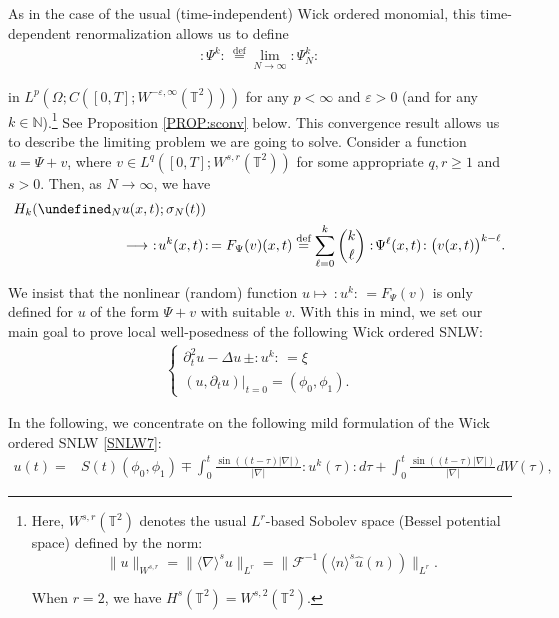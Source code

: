 \documentclass[letterpaper, 11pt,  reqno]{amsart}
\newcommand{\1}{\hspace{0.5mm}\text{I}\hspace{0.5mm}}
\newcommand{\noi}{\noindent}
\newcommand{\T}{\mathbb{T}}
\let\P= \undefined
\newcommand{\P}{\mathbf{P}}
\newcommand{\F}{\mathcal{F}}
\newcommand{\nb}{\nabla}
\newcommand{\Dl}{\Delta}
\newcommand{\eps}{\varepsilon}
\newcommand{\ft}{\widehat}
\newcommand{\dt}{\partial_t}
\renewcommand{\l}{\ell}
\renewcommand{\O}{\Omega}
\newcommand{\jb}[1]
{\langle #1 \rangle}
\newcommand{\N}{\mathbb{N}}
\numberwithin{equation}{section}
\numberwithin{theorem}{section}
\begin{document}
As in the case of  the usual (time-independent) Wick ordered monomial, 
this time-dependent renormalization allows us
to define 
\begin{align}
:\! \Psi^k  \!: \,      \stackrel{\text{def}}= \lim_{N\to \infty}    :\! \Psi_N^k \!: 
\label{Wick2}
\end{align}

\noi
in $L^p(\O; C([0,T];W^{-\eps,\infty}(\T^2)))$
for any $p < \infty$ and $\eps >  0$
(and for any $k \in \N$).\footnote{Here, $W^{s, r}(\T^2)$
denotes the usual $L^r$-based Sobolev space (Bessel potential space) defined by the norm:
\[\| u\|_{W^{s, r}} = \| \jb{\nb}^s u \|_{L^r} = \big\| \F^{-1}( \jb{n}^s \ft u(n))\big\|_{L^r}.\]

\noi
When $r = 2$, we have $H^s(\T^2) = W^{s, 2}(\T^2)$.} 
See Proposition \ref{PROP:sconv} below. 
This convergence result allows us to describe the limiting problem we are going to solve. 
Consider a function $u=\Psi+v$,  where $v\in L^q([0,T];W^{s,r}(\T^2))$ for some appropriate $q,r \ge 1$ and $s >0$. 
Then, as $N \to \infty$, we have
\begin{align}
\label{eq:wick}
H_k(\P_N & u(x, t);  \sigma_N(t))  \notag\\
& \longrightarrow  \ :\!u^k(x, t)\!:\, = F_\Psi(v) (x, t)
\stackrel{\text{def}}{=} \sum_{\ell=0}^k {k\choose \ell} :\! \Psi^\l (x, t)  \!: \big(v(x, t)\big)^{k-\ell}.
\end{align}


\noi
We insist that the  nonlinear (random) function $u \mapsto \, :\!u^k\!:\,  =F_\Psi(v)$ 
is only defined for $u$ of the form $\Psi+v$ with suitable $v$. 
With this in mind,  we set our main goal to prove local well-posedness of 
the following Wick ordered SNLW:
\begin{align}
\begin{cases}
\dt^2 u -  \Dl  u   \, \pm : \!u^{k} \!:\, =  \xi \\
(u, \dt u) |_{t = 0} = (\phi_0, \phi_1). 
\end{cases}
\label{SNLW7}
\end{align}


\noi
In the following, we concentrate on 
the following mild formulation of  the  Wick ordered SNLW \eqref{SNLW7}:
\begin{align}
u(t)= & S(t)(\phi_0,    \phi_1)
 \mp \int_{0}^t  \frac{\sin ((t-\tau)|\nabla|)}{|\nabla|} \!:\! u^k(\tau)\!: \!d\tau 
 + \int_{0}^t \frac{\sin ((t-\tau)|\nabla|)}{|\nabla|}dW(\tau),
\label{SNLW8}
\end{align}
\end{document}
